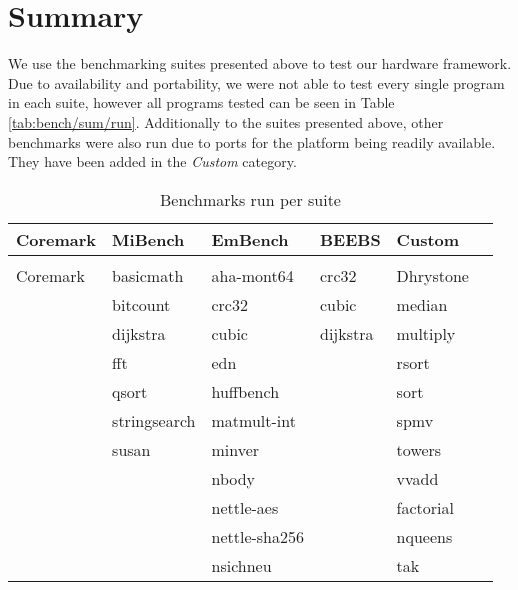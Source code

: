 \documentclass[../bachelor_paper.tex]{subfiles}
\begin{document}
\section{Summary}
    \label{sec:bench/sum}
We use the benchmarking suites presented above to test our hardware framework. Due to availability and portability, we were not able to test every single program in each suite, however all programs tested can be seen in Table \ref{tab:bench/sum/run}. Additionally to the suites presented above, other benchmarks were also run due to ports for the platform being readily available. They have been added in the \emph{Custom} category.

\begin{table}
    \centering
    \caption{Benchmarks run per suite}
    \begin{tabular}{llllll}
        \textbf{Coremark}   & \textbf{MiBench}  & \textbf{EmBench}  & \textbf{BEEBS}    & \textbf{Custom}   \\
        \hline\\[-0.9em]
        Coremark            & basicmath         & aha-mont64        & crc32             & Dhrystone         \\
                            & bitcount          & crc32             & cubic             & median            \\
                            & dijkstra          & cubic             & dijkstra          & multiply          \\
                            & fft               & edn               &                   & rsort             \\
                            & qsort             & huffbench         &                   & sort              \\
                            & stringsearch      & matmult-int       &                   & spmv              \\
                            & susan             & minver            &                   & towers            \\
                            &                   & nbody             &                   & vvadd             \\
                            &                   & nettle-aes        &                   & factorial         \\
                            &                   & nettle-sha256     &                   & nqueens           \\
                            &                   & nsichneu          &                   & tak               \\

\end{tabular}
\end{table}
\end{document}

